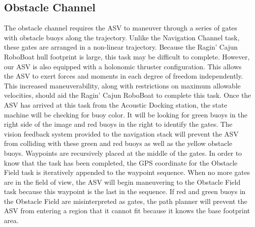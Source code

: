 \documentclass[letterpaper, 10 pt, conference]{ieeeconf}
\begin{document}
\subsection{Obstacle Channel}
\label{ObstacleChannel}
The obstacle channel requires the ASV to maneuver through a series of gates with obstacle buoys along the trajectory. Unlike the Navigation Channel task, these gates are arranged in a non-linear trajectory. Because the Ragin' Cajun RoboBoat hull footprint is large, this task may be difficult to complete. However, our ASV is also equipped with a holonomic thruster configuration. This allows the ASV to exert forces and moments in each degree of freedom independently. This increased maneuverability, along with restrictions on maximum allowable velocities, should aid the Ragin' Cajun RoboBoat to complete this task. Once the ASV has arrived at this task from the Acoustic Docking station, the state machine will be checking for buoy color. It will be looking for green buoys in the right side of the image and red buoys in the right to identify the gates. The vision feedback system provided to the navigation stack will prevent the ASV from colliding with these green and red buoys as well as the yellow obstacle buoys. Waypoints are recursively placed at the middle of the gates. In order to know that the task has been completed, the GPS coordinate for the Obstacle Field task is iteratively appended to the waypoint sequence. When no more gates are in the field of view, the ASV will begin maneuvering to the Obstacle Field task because this waypoint is the last in the sequence. If red and green buoys in the Obstacle Field are misinterpreted as gates, the path planner will prevent the ASV from entering a region that it cannot fit because it knows the base footprint area.
\end{document}
